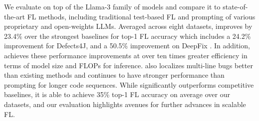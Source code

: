 We evaluate \ourmethod{} on top of the Llama-3 family of models and compare it to state-of-the-art FL methods, including traditional test-based FL and prompting of various proprietary and open-weights LLMs.
Averaged across eight datasets, \ourmethod{} improves by 23.4\% over the strongest baselines for top-1 FL accuracy which includes a 24.2\% improvement for Defects4J, and a 50.5\% improvement on DeepFix \citep{gupta2017deepfix}.
In addition, \ourmethod{} achieves these performance improvements at over ten times greater efficiency in terms of model size and FLOPs for inference. \ourmethod{} also localizes multi-line bugs better than existing methods and continues to have stronger performance than prompting for longer code sequences.
While \ourmethod{} significantly outperforms competitive baselines, it is able to achieve 35\% top-1 FL accuracy on average over our datasets, and our evaluation highlights avenues for further advances in scalable FL.


